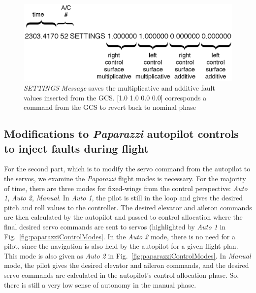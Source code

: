\begin{figure}[h]
\begin{center}
\includegraphics[width=13cm]{figures/flightDataSettings}    %
\caption{\emph{SETTINGS} \emph{Message} saves the multiplicative and additive fault values inserted from the GCS.  [1.0 1.0 0.0 0.0] corresponds a command from the GCS to revert back to nominal phase} 
\label{fig:flightDataSettings}
\end{center}
\end{figure}

\subsection{Modifications to \emph{Paparazzi} autopilot controls to inject faults during flight}

For the second part, which is to modify the servo command from the autopilot to the servos, we examine the \emph{Paparazzi} flight modes is necessary. 
For the majority of time, there are three modes for fixed-wings from the control perspective:  \emph{Auto 1},  \emph{Auto 2},  \emph{Manual}. 
In  \emph{Auto 1}, the pilot is still in the loop and gives the desired pitch and roll values to the controller. The desired elevator and aileron commands are then calculated by the autopilot and passed to control allocation where the final desired servo commands are sent to servos (highlighted by \emph{Auto 1} in Fig.~\ref{fig:paparazziControlModes}. 
In the  \emph{Auto 2} mode, there is no need for a pilot, since the navigation is also held by the autopilot for a given flight plan. 
This mode is also given as  \emph{Auto 2} in Fig.~\ref{fig:paparazziControlModes}.
In  \emph{Manual} mode, the pilot gives the desired elevator and aileron commands, and the desired servo commands are calculated in the autopilot's control allocation phase. So, there is still a very low sense of autonomy in the manual phase. 

